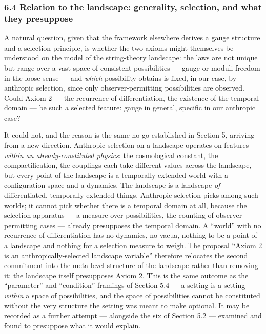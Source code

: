 \documentclass[
]{article}
\begin{document}
\hypertarget{relation-to-the-landscape-generality-selection-and-what-they-presuppose}{%
\subsubsection{6.4 Relation to the landscape: generality, selection, and
what they
presuppose}\label{relation-to-the-landscape-generality-selection-and-what-they-presuppose}}

A natural question, given that the framework elsewhere derives a gauge
structure and a selection principle, is whether the two axioms might
themselves be understood on the model of the string-theory landscape:
the laws are not unique but range over a vast space of consistent
possibilities --- gauge or moduli freedom in the loose sense --- and
\emph{which} possibility obtains is fixed, in our case, by anthropic
selection, since only observer-permitting possibilities are observed.
Could Axiom 2 --- the recurrence of differentiation, the existence of
the temporal domain --- be such a selected feature: gauge in general,
specific in our anthropic case?

It could not, and the reason is the same no-go established in Section 5,
arriving from a new direction. Anthropic selection on a landscape
operates on features \emph{within an already-constituted physics}: the
cosmological constant, the compactification, the couplings each take
different values across the landscape, but every point of the landscape
is a temporally-extended world with a configuration space and a
dynamics. The landscape is a landscape \emph{of} differentiated,
temporally-extended things. Anthropic selection picks among such worlds;
it cannot pick whether there is a temporal domain at all, because the
selection apparatus --- a measure over possibilities, the counting of
observer-permitting cases --- already presupposes the temporal domain. A
``world'' with no recurrence of differentiation has no dynamics, no
vacua, nothing to be a point of a landscape and nothing for a selection
measure to weigh. The proposal ``Axiom 2 is an anthropically-selected
landscape variable'' therefore relocates the second commitment into the
meta-level structure of the landscape rather than removing it: the
landscape itself presupposes Axiom 2. This is the same outcome as the
``parameter'' and ``condition'' framings of Section 5.4 --- a setting is
a setting \emph{within} a space of possibilities, and the space of
possibilities cannot be constituted without the very structure the
setting was meant to make optional. It may be recorded as a further
attempt --- alongside the six of Section 5.2 --- examined and found to
presuppose what it would explain.
\end{document}
